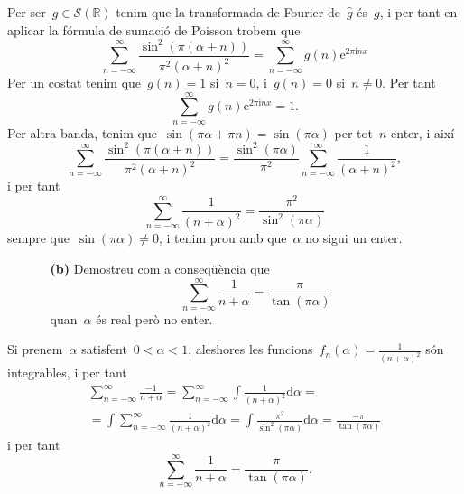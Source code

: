 \documentclass[a4paper]{article}
\theoremstyle{plain}
\newcommand{\iu}{\mathrm{i}}
\newcommand{\e}{\mathrm{e}}
\providecommand{\uppi}{\pi}
\newcommand{\diff}{\mathrm{d}}
\begin{document}
Per ser~\(g\in\mathcal{S}(\mathbb{R})\) tenim que la transformada de Fourier
de~\(\widehat{g}\) és~\(g\), i per tant en aplicar la fórmula de sumació de
Poisson trobem que
\[
    \sum_{n=-\infty}^{\infty}
    \frac{\sin^{2}(\uppi(\alpha+n))}{\uppi^{2}(\alpha+n)^{2}}
    =
    \sum_{n=-\infty}^{\infty}
    g(n) \e^{2\uppi\iu nx}
\]
Per un costat tenim que~\(g(n)=1\) si~\(n=0\), i~\(g(n)=0\) si~\(n\neq0\).
Per tant
\[
    \sum_{n=-\infty}^{\infty}
    g(n) \e^{2\uppi\iu nx}
    = 1.
\]
Per altra banda, tenim que~\(\sin(\uppi\alpha+\uppi n)=\sin(\uppi\alpha)\) per
tot~\(n\) enter, i així
\[
    \sum_{n=-\infty}^{\infty}
    \frac{\sin^{2}(\uppi(\alpha+n))}{\uppi^{2}(\alpha+n)^{2}}
    =
    \frac{\sin^{2}(\uppi\alpha)}{\uppi^{2}}
    \sum_{n=-\infty}^{\infty}
    \frac{1}{(\alpha+n)^{2}},
\]
i per tant
\[
    \sum_{n=-\infty}^{\infty} \frac{1}{(n+\alpha)^{2}}
    = \frac{\uppi^{2}}{\sin^{2}(\uppi\alpha)}
\]
sempre que~\(\sin(\uppi\alpha)\neq0\), i tenim prou amb que~\(\alpha\) no sigui
un enter.

\begin{enumerate}
    \item[]\begin{enumerate}
        \item[\textbf{(b)}] Demostreu com a conseqüència que
            \[
                \sum_{n=-\infty}^{\infty} \frac{1}{n+\alpha}
                = \frac{\uppi}{\tan(\uppi\alpha)}
            \]
            quan~\(\alpha\) és real però no enter.
    \end{enumerate}
\end{enumerate}

Si prenem~\(\alpha\) satisfent~\(0<\alpha<1\), aleshores les
funcions~\(f_{n}(\alpha)=\frac{1}{(n+\alpha)^{2}}\) són integrables, i per tant
\begin{multline*}
    \sum_{n=-\infty}^{\infty}
    \frac{-1}{n+\alpha}
    =
    \sum_{n=-\infty}^{\infty}
    \int
    \frac{1}{(n+\alpha)^{2}}
    \diff\alpha
    = \\ =
    \int
    \sum_{n=-\infty}^{\infty}
    \frac{1}{(n+\alpha)^{2}}
    \diff\alpha
    =
    \int
    \frac{\uppi^{2}}{\sin^{2}(\uppi\alpha)}
    \diff\alpha
    =
    \frac{-\uppi}{\tan(\uppi\alpha)}
\end{multline*}
i per tant
\[
    \sum_{n=-\infty}^{\infty} \frac{1}{n+\alpha}
    = \frac{\uppi}{\tan(\uppi\alpha)}.
\]
\end{document}
